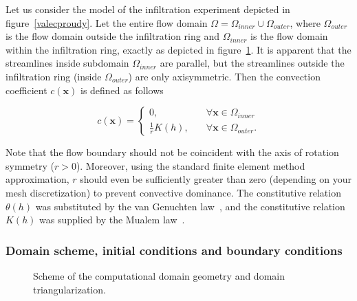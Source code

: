 \documentclass[review]{myarticle}
\newenvironment{lineq}
    {\begin{linenomath*}
    \begin{equation}
    }
    { 
    \end{equation} 
    \end{linenomath*}
    }
\renewcommand{\vec}{\mathbf}
\begin{document}
Let us consider the model of the infiltration experiment depicted in figure~\ref{valecproudy}. Let the entire flow domain $\Omega=\Omega_{inner} \cup \Omega_{outer}$, where $\Omega_{outer}$ is the flow domain outside the infiltration ring and $\Omega_{inner}$ is the flow domain within the infiltration ring, exactly as depicted in figure~\ref{valec}. It is apparent that the streamlines inside subdomain $\Omega_{inner}$ are parallel, but the streamlines outside the infiltration ring (inside $\Omega_{outer}$) are only axisymmetric.  Then the convection coefficient $c(\vec{x})$ is defined as follows
\begin{lineq}
\label{convect}
c(\vec{x}) = \begin{cases}
	     0 , \quad &\forall \vec{x} \in \Omega_{inner} \\
	     \frac{1}{r}K(h) , \quad &\forall \vec{x} \in \Omega_{outer}.
	    \end{cases}
\end{lineq}
Note that  the flow boundary should not be coincident with the axis of rotation symmetry ($r>0$). Moreover, using the standard finite element method approximation, $r$ should even be sufficiently greater than zero (depending on your mesh discretization) to prevent convective dominance. The constitutive relation $\theta(h)$ was substituted by the van Genuchten law~\citep{vangenuchten}, and the constitutive relation $K(h)$ was supplied by the Mualem law~\citep{mualem}.





\subsubsection{Domain scheme, initial conditions and boundary conditions}%
\label{bccond}
 \begin{figure}
\centering
{}
 \caption{Scheme of the computational domain geometry and domain triangularization.}
 \label{valec}
\end{figure}
\end{document}
